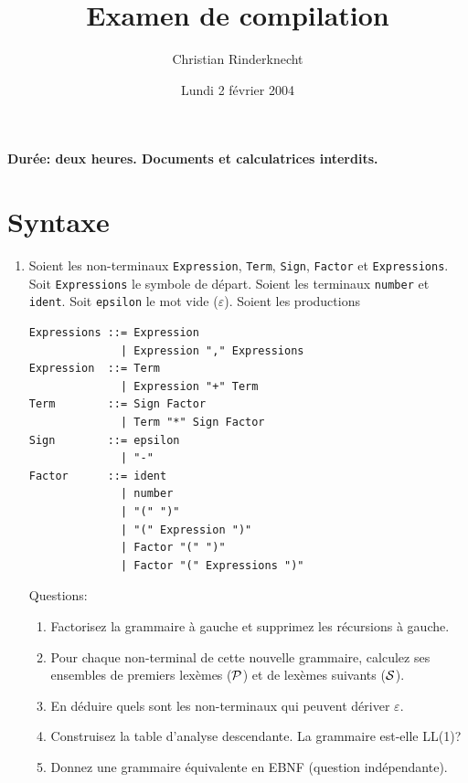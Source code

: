 \documentclass[11pt,a4paper]{article}
\title{Examen de compilation}
\author{Christian Rinderknecht}
\date{Lundi 2 février 2004}
\begin{document}
\maketitle

\centerline{\textbf{Durée: deux heures. Documents et calculatrices interdits.}}


\section{Syntaxe}

\begin{enumerate}

  \item Soient les non-terminaux \texttt{Expression}, \texttt{Term},
  \texttt{Sign}, \texttt{Factor} et \texttt{Expressions}. Soit
  \texttt{Expressions} le symbole de départ. Soient les terminaux
  \texttt{number} et \texttt{ident}. Soit \texttt{epsilon} le mot vide
  ($\varepsilon$). Soient les productions
  {\small
  \begin{verbatim}
Expressions ::= Expression
              | Expression "," Expressions
Expression  ::= Term
              | Expression "+" Term
Term        ::= Sign Factor
              | Term "*" Sign Factor
Sign        ::= epsilon
              | "-"
Factor      ::= ident
              | number
              | "(" ")"
              | "(" Expression ")"
              | Factor "(" ")"
              | Factor "(" Expressions ")"
  \end{verbatim}
  }
  \noindent Questions:
  \begin{enumerate}

    \item Factorisez la grammaire à gauche et supprimez les récursions à
    gau\-che.

    \item Pour chaque non-terminal de cette nouvelle grammaire,
    calculez ses ensembles de premiers lexèmes (${\cal P}$) et de
    lexèmes suivants (${\cal S}$).

    \item En déduire quels sont les non-terminaux qui peuvent dériver
    $\varepsilon$.

    \item Construisez la table d'analyse descendante. La grammaire
    est-elle LL(1)?

    \item Donnez une grammaire équivalente en EBNF (question indépendan\-te).

  \end{enumerate}


\end{enumerate}
\end{document}
